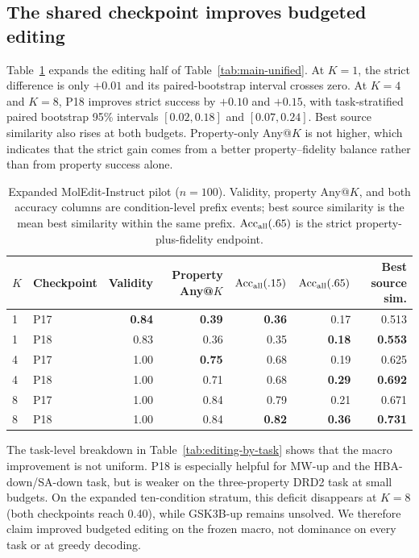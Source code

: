 \subsection{The shared checkpoint improves budgeted editing}
Table~\ref{tab:editing-budget} expands the editing half of
Table~\ref{tab:main-unified}. At $K=1$, the strict difference is only $+0.01$
and its paired-bootstrap interval crosses zero. At $K=4$ and $K=8$, P18
improves strict success by $+0.10$ and $+0.15$, with task-stratified paired
bootstrap 95\% intervals $[0.02,0.18]$ and $[0.07,0.24]$. Best source
similarity also rises at both budgets. Property-only Any@$K$ is not higher,
which indicates that the strict gain comes from a better property--fidelity
balance rather than from property success alone.

\begin{table}[t]
  \centering
  \caption{Expanded MolEdit-Instruct pilot ($n=100$). Validity, property
  Any@$K$, and both accuracy columns are condition-level prefix events; best
  source similarity is the mean best similarity within the same prefix.
  $\operatorname{Acc}_{\rm all}(.65)$ is the strict property-plus-fidelity
  endpoint.}
  \label{tab:editing-budget}
  \small
  \setlength{\tabcolsep}{5pt}
  \begin{tabular}{llrrrrr}
    \toprule
    $K$ & Checkpoint & Validity & Property Any@$K$
      & $\operatorname{Acc}_{\rm all}(.15)$
      & $\operatorname{Acc}_{\rm all}(.65)$ & Best source sim. \\
    \midrule
    1 & P17 & \textbf{0.84} & \textbf{0.39} & \textbf{0.36} & 0.17 & 0.513 \\
    1 & P18 & 0.83 & 0.36 & 0.35 & \textbf{0.18} & \textbf{0.553} \\
    \midrule
    4 & P17 & 1.00 & \textbf{0.75} & 0.68 & 0.19 & 0.625 \\
    4 & P18 & 1.00 & 0.71 & 0.68 & \textbf{0.29} & \textbf{0.692} \\
    \midrule
    8 & P17 & 1.00 & 0.84 & 0.79 & 0.21 & 0.671 \\
    8 & P18 & 1.00 & 0.84 & \textbf{0.82} & \textbf{0.36} & \textbf{0.731} \\
    \bottomrule
  \end{tabular}
\end{table}

The task-level breakdown in Table~\ref{tab:editing-by-task} shows that the
macro improvement is not uniform. P18 is especially helpful for MW-up and the
HBA-down/SA-down task, but is weaker on the three-property DRD2 task at small
budgets. On the expanded ten-condition stratum, this deficit disappears at
$K=8$ (both checkpoints reach 0.40), while GSK3B-up remains unsolved. We
therefore claim improved budgeted editing on the frozen macro, not dominance
on every task or at greedy decoding.

